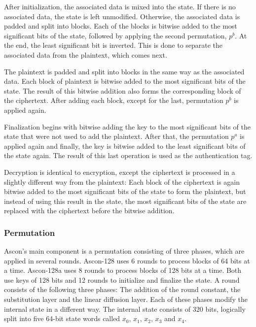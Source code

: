 After initialization, the associated data is mixed into the state. If there is
no associated data, the state is left unmodified. Otherwise, the associated data
is padded and split into blocks. Each of the blocks is bitwise added to the most
significant bits of the state, followed by applying the second permutation,
$p^b$. At the end, the least significant bit is inverted. This is done to
separate the associated data from the plaintext, which comes next.

The plaintext is padded and split into blocks in the same way as the associated
data. Each block of plaintext is bitwise added to the most significant bits of
the state. The result of this bitwise addition also forms the corresponding
block of the ciphertext. After adding each block, except for the last,
permutation $p^b$ is applied again.

Finalization begins with bitwise adding the key to the most significant bits of
the state that were not used to add the plaintext. After that, the permutation
$p^a$ is applied again and finally, the key is bitwise added to the least
significant bits of the state again. The result of this last operation is used
as the authentication tag.

Decryption is identical to encryption, except the ciphertext is processed in a
slightly different way from the plaintext: Each block of the ciphertext is again
bitwise added to the most significant bits of the state to form the plaintext,
but instead of using this result in the state, the most significant bits of the
state are replaced with the ciphertext before the bitwise addition.

\subsubsection{Permutation}

Ascon's main component is a permutation consisting of three phases, which are
applied in several rounds. Ascon-128 uses 6 rounds to process blocks of 64 bits
at a time. Ascon-128a uses 8 rounds to process blocks of 128 bits at a time.
Both use keys of 128 bits and 12 rounds to initialize and finalize the state. A
round consists of the following three phases: The addition of the round
constant, the substitution layer and the linear diffusion layer. Each of these
phases modify the internal state in a different way. The internal state consists
of 320 bits, logically split into five 64-bit state words called $x_0$, $x_1$,
$x_2$, $x_3$ and $x_4$.

